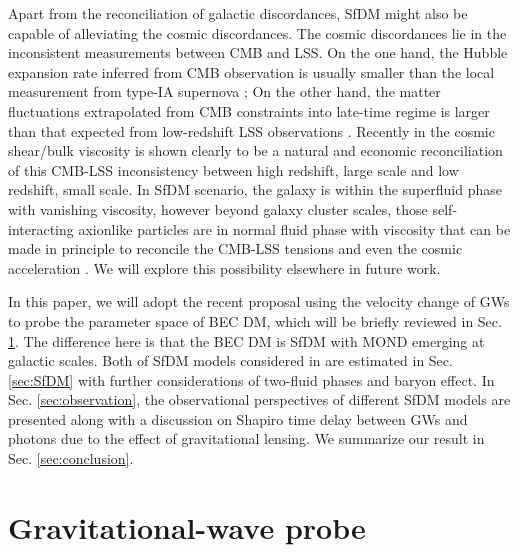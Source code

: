 \documentclass[aps,prd,twocolumn,10pt,groupedaddress]{revtex4-1}
\begin{document}
Apart from the reconciliation of galactic discordances, SfDM might also be capable of alleviating the cosmic discordances. The cosmic discordances lie in the inconsistent measurements between CMB and LSS. On the one hand, the Hubble expansion rate inferred from CMB observation \cite{Ade:2015xua} is usually smaller than the local measurement from type-IA supernova \cite{Riess:2016jrr}; On the other hand, the matter fluctuations extrapolated from CMB constraints \cite{Ade:2015xua} into late-time regime is larger than that expected from low-redshift LSS observations \cite{Troxel:2017xyo,Abbott:2017wau}. Recently in \cite{Anand:2017wsj} the cosmic shear/bulk viscosity is shown clearly to be a natural and economic reconciliation of this CMB-LSS inconsistency between high redshift, large scale and low redshift, small scale. In SfDM scenario, the galaxy is within the superfluid phase with vanishing viscosity, however beyond galaxy cluster scales, those self-interacting axionlike particles are in normal fluid phase with viscosity that can be made in principle to reconcile the CMB-LSS tensions and even the cosmic acceleration \cite{Atreya:2017pny}. We will explore this possibility elsewhere in future work.

In this paper, we will adopt the recent proposal \cite{Dev:2016hxv} using the velocity change of GWs to probe the parameter space of BEC DM, which will be briefly reviewed in Sec. \ref{sec:GWprobe}. The difference here is that the BEC DM is SfDM with MOND emerging  at galactic scales. Both of SfDM models  considered in \cite{Berezhiani:2015bqa,Khoury:2016ehj} are estimated in Sec. \ref{sec:SfDM} with further considerations of two-fluid phases \cite{Hodson:2016rck} and baryon effect. In Sec. \ref{sec:observation}, the observational perspectives of different SfDM models are presented along with a discussion on Shapiro time delay between GWs and photons due to the effect of gravitational lensing. We summarize our result in Sec. \ref{sec:conclusion}.

\section{Gravitational-wave probe} \label{sec:GWprobe}
\end{document}
